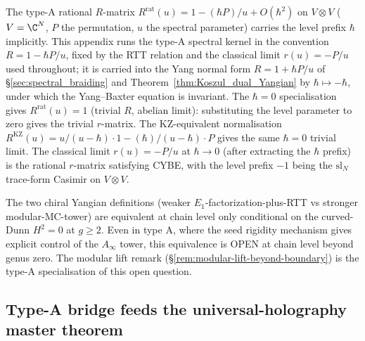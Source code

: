 \begin{remark}
\label{rem:typeA-baxter-rees-rmatrix-level-prefix}
The type-A rational $R$-matrix
$R^{\mathrm{rat}}(u) = 1 - (\hbar P)/u + O(\hbar^2)$ on
$V\otimes V$ ($V = \C^N$, $P$ the permutation, $u$ the spectral
parameter) carries the level prefix $\hbar$ implicitly. This
appendix runs the type-A spectral kernel in the convention
$R = 1 - \hbar P/u$, fixed by the RTT relation and the classical
limit $r(u) = -P/u$ used throughout; it is carried into the Yang
normal form $R = 1 + \hbar P/u$ of
\S\ref{sec:spectral_braiding} and
Theorem~\ref{thm:Koszul_dual_Yangian} by $\hbar \mapsto -\hbar$,
under which the Yang--Baxter equation is invariant. The
$\hbar=0$ specialisation gives $R^{\mathrm{rat}}(u) = 1$ (trivial
$R$, abelian limit): substituting the level parameter to zero gives
the trivial $r$-matrix. The KZ-equivalent normalisation
$R^{\mathrm{KZ}}(u) = u/(u-\hbar)\cdot 1 - (\hbar)/(u-\hbar)\cdot P$
gives the same $\hbar=0$ trivial limit. The
classical limit $r(u) = -P/u$ at $\hbar\to 0$
(after extracting the $\hbar$ prefix) is the rational $r$-matrix
satisfying CYBE, with the level prefix $-1$ being the $\mathrm{sl}_N$
trace-form Casimir on $V\otimes V$.
\end{remark}

\begin{remark}
\label{rem:typeA-baxter-rees-two-definitions}
The two chiral Yangian definitions (weaker
$E_1$-factorization-plus-RTT vs stronger modular-MC-tower) are
equivalent at chain level only conditional on the curved-Dunn
$H^2 = 0$ at $g\ge 2$. Even in type A, where
the seed rigidity mechanism gives explicit control of the
$A_\infty$ tower, this equivalence is OPEN at chain level
beyond genus zero. The modular lift remark
(\S\ref{rem:modular-lift-beyond-boundary}) is the type-A
specialisation of this open question.
\end{remark}

\subsection{Type-A bridge feeds the universal-holography master
theorem}
\label{subsec:typeA-baxter-rees-holography-anchor}

